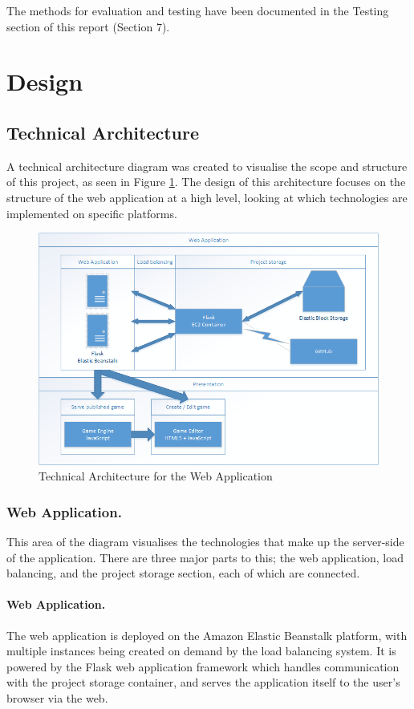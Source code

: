 \documentclass[a4paper, 12pt]{article}
\begin{document}
The methods for evaluation and testing have been documented in the Testing section of this report (Section 7).

\section{Design}
\subsection{Technical Architecture}
A technical architecture diagram was created to visualise the scope and structure of this project, as seen in Figure \ref{fig:architecture}. The design of this architecture focuses on the structure of the web application at a high level, looking at which technologies are implemented on specific platforms.

\begin{figure}[h]
	\centering
	\includegraphics[scale=0.72]{architecture}
	\caption{Technical Architecture for the Web Application}
	\label{fig:architecture}
\end{figure}

\subsubsection{Web Application.}
This area of the diagram visualises the technologies that make up the server-side of the application. There are three major parts to this; the web application, load balancing, and the project storage section, each of which are connected.

\paragraph{Web Application.}
The web application is deployed on the Amazon Elastic Beanstalk platform, with multiple instances being created on demand by the load balancing system. It is powered by the Flask web application framework which handles communication with the project storage container, and serves the application itself to the user's browser via the web.
\end{document}
